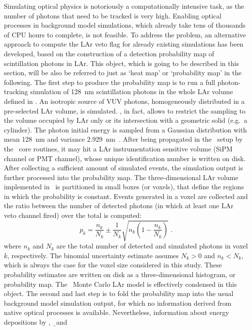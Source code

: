Simulating optical physics is notoriously a computationally intensive task, as the number
of photons that need to be tracked is very high. Enabling optical processes in background
model simulations, which already take tens of thousands of CPU hours to complete, is not
feasible. To address the problem, an alternative approach to compute the LAr veto flag for
already existing simulations has been developed, based on the construction of a detection
probability map of scintillation photons in LAr. This object, which is going to be
described in this section, will be also be referred to just as `heat map' or
`probability map' in the following.
\newpar
The first step to produce the probability map is to run a full photon-tracking simulation
of 128~nm scintillation photons in the whole LAr volume defined in \mage. An isotropic
source of VUV photons, homogeneously distributed in a pre-selected LAr volume, is
simulated.  \mage, in fact, allows to restrict the sampling to the volume occupied by LAr
only or its intersection with a geometric solid (e.g.~a cylinder). The photon initial
energy is sampled from a Gaussian distribution with mean 128~nm and variance
2.929~nm~\cite{Heindl2010}. After being propagated in the \gerda\ setup by the \geant\
core routines, it may hit a LAr instrumentation sensitive volume (SiPM channel or PMT
channel), whose unique identification number is written on disk. After collecting
a sufficient amount of simulated events, the simulation output is further processed into
the probability map. The three-dimensional LAr volume implemented in \mage\ is partitioned
in small boxes (or voxels), that define the regions in which the probability is constant.
Events generated in a voxel are collected and the ratio between the number of detected
photons (in which at least one LAr veto channel fired) over the total is computed:
\[
  p_k = \frac{n_k}{N_k} \pm \frac{1}{N_k}\sqrt{n_k \left(1 - \frac{n_k}{N_k} \right)} \;.
\]
where $n_k$ and $N_k$ are the total number of detected and simulated photons in voxel $k$,
respectively. The binomial uncertainty estimate assumes $N_k>0$ and $n_k<N_k$, which is
always the case for the voxel size considered in this study.  These probability estimates
are written on disk as a three-dimensional histogram, or probability map. The \gerda\
Monte Carlo LAr model is effectively condensed in this object.
\newpar
The second and last step is to fold the probability map into the usual background model
simulation output, for which no information derived from native optical processes is
available.  Nevertheless, information about energy depositions by \g, \b\ and \a\

